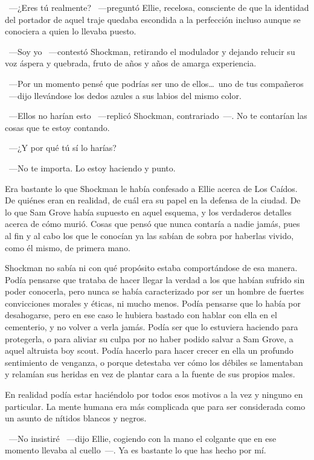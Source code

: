 ~---¿Eres tú realmente? ~---preguntó Ellie, recelosa, consciente de que la identidad del portador de aquel traje quedaba escondida a la perfección incluso aunque se conociera a quien lo llevaba puesto.

~---Soy yo ~---contestó Shockman, retirando el modulador y dejando relucir su voz áspera y quebrada, fruto de años y años de amarga experiencia.

~---Por un momento pensé que podrías ser uno de ellos\dots\ uno de tus compañeros ~---dijo llevándose los dedos azules a sus labios del mismo color.

~---Ellos no harían esto ~---replicó Shockman, contrariado~---. No te contarían las cosas que te estoy contando.

~---¿Y por qué tú sí lo harías?

~---No te importa. Lo estoy haciendo y punto.

Era bastante lo que Shockman le había confesado a Ellie acerca de Los Caídos. De quiénes eran en realidad, de cuál era su papel en la defensa de la ciudad. De lo que Sam Grove había supuesto en aquel esquema, y los verdaderos detalles acerca de cómo murió. Cosas que pensó que nunca contaría a nadie jamás, pues al fin y al cabo los que le conocían ya las sabían de sobra por haberlas vivido, como él mismo, de primera mano.

Shockman no sabía ni con qué propósito estaba comportándose de esa manera. Podía pensarse que trataba de hacer llegar la verdad a los que habían sufrido sin poder conocerla, pero nunca se había caracterizado por ser un hombre de fuertes convicciones morales y éticas, ni mucho menos. Podía pensarse que lo había por desahogarse, pero en ese caso le hubiera bastado con hablar con ella en el cementerio, y no volver a verla jamás. Podía ser que lo estuviera haciendo para protegerla, o para aliviar su culpa por no haber podido salvar a Sam Grove, a aquel altruista boy scout. Podía hacerlo para hacer crecer en ella un profundo sentimiento de venganza, o porque detestaba ver cómo los débiles se lamentaban y relamían sus heridas en vez de plantar cara a la fuente de sus propios males.

En realidad podía estar haciéndolo por todos esos motivos a la vez y ninguno en particular. La mente humana era más complicada que para ser considerada como un asunto de nítidos blancos y negros.

~---No insistiré ~---dijo Ellie, cogiendo con la mano el colgante que en ese momento llevaba al cuello~---. Ya es bastante lo que has hecho por mí.

